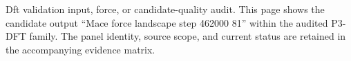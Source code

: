 Dft validation input, force, or candidate-quality audit. This page shows the candidate output ``Mace force landscape step 462000 81'' within the audited P3-DFT family. The panel identity, source scope, and current status are retained in the accompanying evidence matrix.
